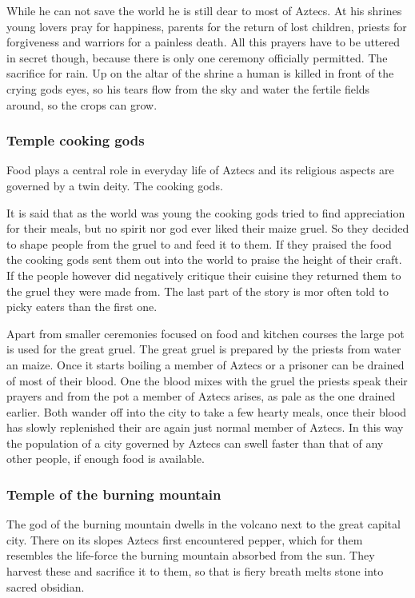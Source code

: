 \documentclass[a4paper]{article}
\begin{document}
			While he can not save the world he is still dear to most of \gls{Aztecs}.
			At his shrines young lovers pray for happiness,
			parents for the return of lost children,
			priests for forgiveness and warriors for a painless death.
			All this prayers have to be uttered in secret though,
			because there is only one ceremony officially permitted.
			The sacrifice for rain.
			Up on the altar of the shrine a human is killed in front of the crying gods eyes,
			so his tears flow from the sky and water the fertile fields around,
			so the crops can grow.

		\subsubsection{Temple cooking gods}
			Food plays a central role in everyday life of \gls{Aztecs}
			and its religious aspects are governed by a twin deity.
			The cooking gods.

			It is said that as the world was young the cooking gods tried to find
			appreciation for their meals, but no spirit nor god ever liked their maize gruel.
			So they decided to shape people from the gruel to and feed it to them.
			If they praised the food the cooking gods sent them out into the world to
			praise the height of their craft.
			If the people however did negatively critique their cuisine they returned them
			to the gruel they were made from.
			The last part of the story is mor often told to picky eaters than the first one.

			Apart from smaller ceremonies focused on food and kitchen courses the large pot is used
			for the great gruel.
			The great gruel is prepared by the priests from water an maize.
			Once it starts boiling a member of \gls{Aztecs} or a prisoner can be drained of most of their blood.
			One the blood mixes with the gruel the priests speak their prayers and from the pot
			a member of \gls{Aztecs} arises, as pale as the one drained earlier.
			Both wander off into the city to take a few hearty meals,
			once their blood has slowly replenished their are again just normal member of \gls{Aztecs}.
			In this way the population of a city governed by \gls{Aztecs} 
			can swell faster than that of any other people, if enough food is available.

		\subsubsection{Temple of the burning mountain}
			The god of the burning mountain dwells in the volcano next to the great capital city.
			There on its slopes \gls{Aztecs} first encountered pepper,
			which for them resembles the life-force the burning mountain absorbed from the sun.
			They harvest these and sacrifice it to them,
			so that is fiery breath melts stone into sacred obsidian.
\end{document}
